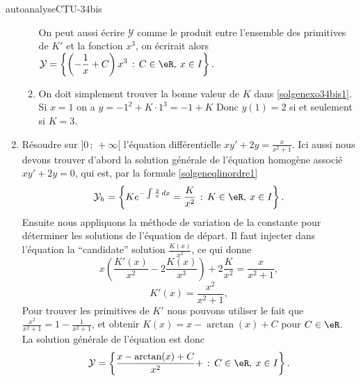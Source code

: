 \begin{corrige}{autoanalyseCTU-34bis}
\begin{enumerate}
\begin{enumerate}
      \begin{remark}
        On peut aussi écrire $ \mathcal{Y}$ comme le produit entre l'ensemble des primitives de $K'$ et la fonction $x^3$, on écrirait alors $\displaystyle\mathcal{Y}=\left\{ \left(-\frac{1}{x} + C\right)x^3 \,:\, C\in\eR, \: x\in I \right\}.$
      \end{remark}
    \item On doit simplement trouver la bonne valeur de $K$ dans \eqref{solgenexo34bis1}. Si $x=1$ on a $y = -1^2 + K\cdot 1^3 = -1 +K$ Donc $y(1) =2$ si et seulement si $K = 3$. 
    \end{enumerate}
  \item Résoudre  sur $]0\,;\,+\infty[$ l'équation différentielle $xy'+2y=\frac{x}{x^2+1}$. Ici aussi nous devons trouver d'abord la solution générale de l'équation homogène associé $xy' + 2y =0$, qui est, par la formule \eqref{solgeneqlinordre1}
      \begin{equation*}
        \mathcal{Y}_h=\left\{Ke^{-\int\frac{2}{x}\, dx} = \frac{K}{x^2}\,:\, K\in\eR, \: x\in I \right\}.
      \end{equation*}
      Ensuite nous appliquons la méthode de variation de la constante pour déterminer les solutions de l'équation de départ. Il faut injecter dans l'équation la ``candidate'' solution $\displaystyle \frac{K(x)}{x^2}$, ce qui donne
      \begin{equation*}
        x\left( \frac{K'(x)}{x^2} - 2\frac{K(x)}{x^3}\right) + 2\frac{K}{x^2} =\frac{x}{x^2+1}, 
      \end{equation*}
      \begin{equation*}
        K'(x)=\frac{x^2}{x^2+1}, 
      \end{equation*}
      Pour trouver les primitives de $K'$ nous pouvons utiliser le fait que $\displaystyle \frac{x^2}{x^2+1} =1 - \frac{1}{x^2+1}$, et obtenir $K(x) = x - \arctan(x) +C$ pour $C \in\eR$. La solution générale de l'équation est donc   
      \begin{equation*}
        \mathcal{Y}=\left\{\frac{x-\arctan(x)+ C}{x^2} + \,:\, C\in\eR, \: x\in I\right \}.
      \end{equation*}
\end{enumerate}


\end{corrige}   
